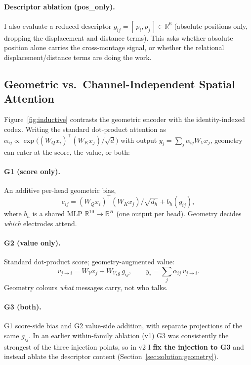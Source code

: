 \documentclass[11pt]{article}
\begin{document}
\paragraph{Descriptor ablation (pos\_only).}
I also evaluate a reduced descriptor $g_{ij} = [\,p_i, p_j\,] \in
\mathbb{R}^6$ (absolute positions only, dropping the displacement and
distance terms). This asks whether absolute position alone carries the
cross-montage signal, or whether the relational displacement/distance terms
are doing the work.

\subsection{Geometric vs.\ Channel-Independent Spatial Attention}
\label{sec:solution:contrast}

Figure~\ref{fig:inductive} contrasts the geometric encoder with the
identity-indexed codex. Writing the standard dot-product attention as
$\alpha_{ij} \propto \exp\!\bigl((W_Q x_i)^{\!\top}(W_K x_j)/\sqrt{d}\bigr)$
with output $y_i = \sum_j \alpha_{ij} W_V x_j$, geometry can enter at the
score, the value, or both:



\paragraph{G1 (score only).}
An additive per-head geometric bias,
\begin{equation}
  e_{ij} = (W_Q x_i)^{\!\top}(W_K x_j)/\sqrt{d_h} + b_h(g_{ij}),
  \label{eq:opt1}
\end{equation}
where $b_h$ is a shared MLP $\mathbb{R}^{10} \to \mathbb{R}^H$ (one output
per head). Geometry decides \emph{which} electrodes attend.

\paragraph{G2 (value only).}
Standard dot-product score; geometry-augmented value:
\begin{equation}
  v_{j \to i} = W_V x_j + W_{V,g}\, g_{ij},
  \qquad y_i = \sum_j \alpha_{ij}\, v_{j \to i}.
  \label{eq:opt2}
\end{equation}
Geometry colours \emph{what} messages carry, not who talks.

\paragraph{G3 (both).}
G1 score-side bias and G2 value-side addition, with separate projections of
the same $g_{ij}$. In an earlier within-family ablation (v1) G3 was
consistently the strongest of the three injection points, so in v2 I
\textbf{fix the injection to G3} and instead ablate the descriptor content
(Section~\ref{sec:solution:geometry}).
\end{document}
